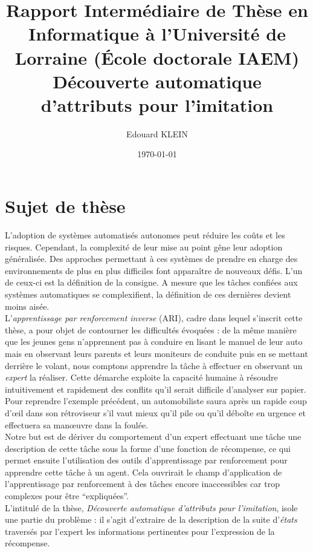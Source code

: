 \documentclass[11pt]{article}
\title{Rapport Intermédiaire de Thèse en Informatique à l'Université de Lorraine (\'Ecole doctorale IAEM)\\
Découverte automatique d'attributs pour l'imitation}
\author{Edouard KLEIN}
\date{\today}
\begin{document}
\maketitle
\section*{Sujet de thèse}
L'adoption de systèmes automatisés autonomes peut réduire les coûts et les risques. Cependant, la complexité de leur mise au point gêne leur adoption généralisée. Des approches permettant à ces systèmes de prendre en charge des environnements de plus en plus difficiles font apparaître de nouveaux défis. L'un de ceux-ci est la définition de la consigne. A mesure que les tâches confiées aux systèmes automatiques se complexifient, la définition de ces dernières devient moins aisée.\\

  L'\emph{apprentissage par renforcement inverse} (ARI), cadre dans lequel s'inscrit cette thèse, a pour objet de contourner les difficultés évoquées : de la même manière que les jeunes gens n'apprennent pas à conduire en lisant le manuel de leur auto mais en observant leurs parents et leurs moniteurs de conduite puis en se mettant derrière le volant, nous comptons apprendre la tâche à effectuer en observant un \emph{expert} la réaliser. Cette démarche exploite la capacité humaine à résoudre intuitivement et rapidement des conflits qu'il serait difficile d'analyser sur papier. Pour reprendre l'exemple précédent, un automobiliste saura après un rapide coup d'œil dans son rétroviseur s'il vaut mieux qu'il pile ou qu'il déboîte en urgence et effectuera sa manœuvre dans la foulée.\\

  Notre but est de dériver du comportement d'un expert effectuant une tâche une description de cette tâche sous la forme d'une fonction de récompense, ce qui permet ensuite l'utilisation des outils d'apprentissage par renforcement pour apprendre cette tâche à un agent. Cela ouvrirait le champ d'application de l'apprentissage par renforcement à des tâches encore inaccessibles car trop complexes pour être ``expliquées''.\\
  L'intitulé de la thèse, \emph{Découverte automatique d'attributs pour l'imitation}, isole une partie du problème : il s'agit d'extraire de la description de la suite d'\emph{états} traversés par l'expert les informations pertinentes pour l'expression de la récompense.\\
\end{document}
